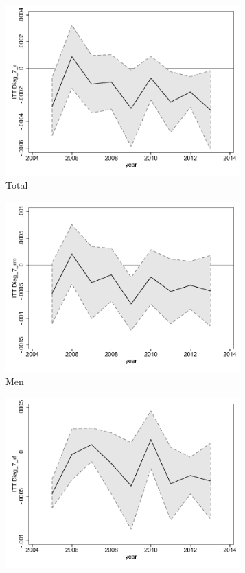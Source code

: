 \documentclass[a4paper ]{article}
\begin{document}
\begin{figure}[h!]
	\centering
	\begin{subfigure}[t]{0.31\textwidth}
		\centering
		\includegraphics[width=0.99\textwidth]{R1_LC_Diag_7_r}
		\caption{Total}		
	\end{subfigure}
	\begin{subfigure}[t]{0.31\textwidth}
		\centering
		\includegraphics[width=0.99\textwidth]{R1_LC_Diag_7_rm}
		\caption{Men}		
	\end{subfigure}
	\quad
	\begin{subfigure}[t]{0.31\textwidth}
		\centering
		\includegraphics[width=0.99\textwidth]{R1_LC_Diag_7_rf}

\end{subfigure}
\end{figure}
\end{document}

